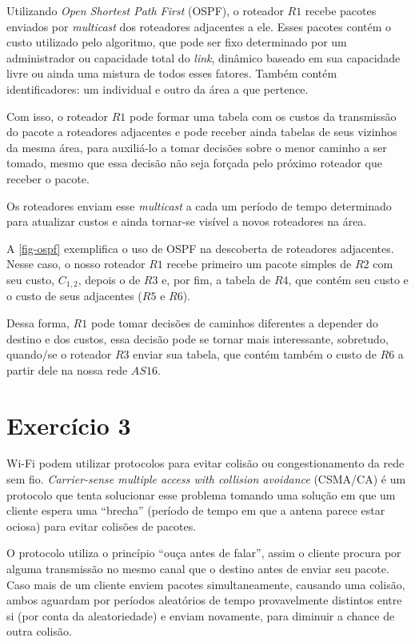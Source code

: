\documentclass[brazilian,a4paper]{article}
\begin{document}
Utilizando \textit{Open Shortest Path First} (OSPF), o roteador $R1$ recebe pacotes enviados por \textit{multicast} dos roteadores adjacentes a ele. Esses pacotes contém o custo utilizado pelo algoritmo, que pode ser fixo determinado por um administrador ou capacidade total do \textit{link}, dinâmico baseado em sua capacidade livre ou ainda uma mistura de todos esses fatores. Também contém identificadores: um individual e outro da área a que pertence.

Com isso, o roteador $R1$ pode formar uma tabela com os custos da transmissão do pacote a roteadores adjacentes e pode receber ainda tabelas de seus vizinhos da mesma área, para auxiliá-lo a tomar decisões sobre o menor caminho a ser tomado, mesmo que essa decisão não seja forçada pelo próximo roteador que receber o pacote.

Os roteadores enviam esse \textit{multicast} a cada um período de tempo determinado para atualizar custos e ainda tornar-se visível a novos roteadores na área.

A \cref{fig-ospf} exemplifica o uso de OSPF na descoberta de roteadores adjacentes. Nesse caso, o nosso roteador $R1$ recebe primeiro um pacote simples de $R2$ com seu custo, $C_{1,2}$, depois o de $R3$ e, por fim, a tabela de $R4$, que contém seu custo e o custo de seus adjacentes ($R5$ e $R6$).

Dessa forma, $R1$ pode tomar decisões de caminhos diferentes a depender do destino e dos custos, essa decisão pode se tornar mais interessante, sobretudo, quando/se o roteador $R3$ enviar sua tabela, que contém também o custo de $R6$ a partir dele na nossa rede $AS 16$.


\section*{Exercício 3}

Wi-Fi podem utilizar protocolos para evitar colisão ou congestionamento da rede sem fio. \textit{Carrier-sense multiple access with collision avoidance} (CSMA/CA) é um protocolo que tenta solucionar esse problema tomando uma solução em que um cliente espera uma ``brecha'' (período de tempo em que a antena parece estar ociosa) para evitar colisões de pacotes.

O protocolo utiliza o princípio ``ouça antes de falar'', assim o cliente procura por alguma transmissão no mesmo canal que o destino antes de enviar seu pacote. Caso mais de um cliente enviem pacotes simultaneamente, causando uma colisão, ambos aguardam por períodos aleatórios de tempo provavelmente distintos entre si (por conta da aleatoriedade) e enviam novamente, para diminuir a chance de outra colisão.
\end{document}
